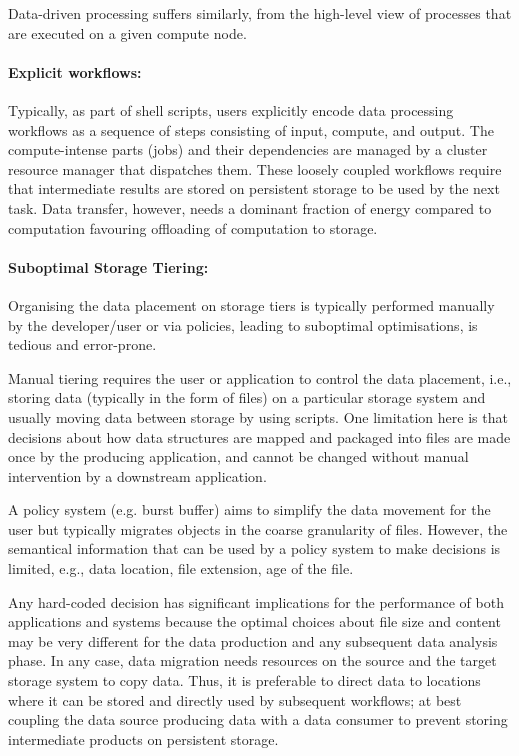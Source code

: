 \documentclass[a4paper, twocolumn]{article}
\begin{document}
Data-driven processing suffers similarly, from the high-level view of processes that are executed on a given compute node.


\paragraph{Explicit workflows:}
Typically, as part of shell scripts, users explicitly encode data processing workflows as a sequence of steps consisting of input, compute, and output.
The compute-intense parts (jobs) and their dependencies are managed by a cluster resource manager that dispatches them.
These loosely coupled workflows require that intermediate results are stored on persistent storage to be used by the next task.
Data transfer, however, needs a dominant fraction of energy compared to computation favouring offloading of computation to storage.


\paragraph{Suboptimal Storage Tiering:}
Organising the data placement on storage tiers is typically performed manually by the developer/user or via policies, leading to suboptimal optimisations, is tedious and error-prone.

Manual tiering requires the user or application to control the data placement, i.e., storing data (typically in the form of files) on a particular storage system and usually moving data between storage by using scripts.
One limitation here is that decisions about how data structures are mapped and packaged into files are made once by the producing application, and cannot be changed without manual intervention by a downstream application.

A policy system (e.g. burst buffer) aims to simplify the data movement for the user but typically migrates objects in the coarse granularity of files.
However, the semantical information that can be used by a policy system to make decisions is limited, e.g.,  data location, file extension, age of the file.

Any hard-coded decision has significant implications for the performance of both applications and systems because the optimal choices about file size and content may be very different for the data production and any subsequent data analysis phase.
In any case, data migration needs resources on the source and the target storage system to copy data.
Thus, it is preferable to direct data to locations where it can be stored and directly used by subsequent workflows; at best coupling the data source producing data with a data consumer to prevent storing intermediate products on persistent storage.
\end{document}
